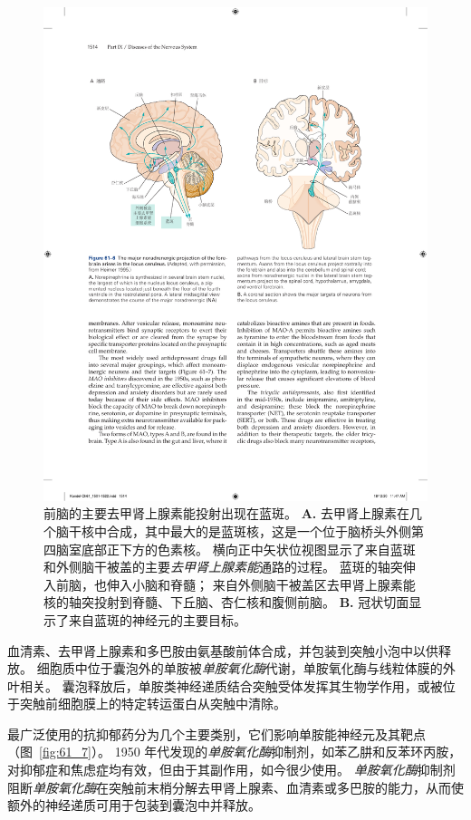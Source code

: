 \begin{figure}[htbp]
	\centering
	\includegraphics[width=1.0\linewidth]{chap61/fig_61_6}
	\caption{前脑的主要去甲肾上腺素能投射出现在蓝斑\cite{heimer2012human}。
		\textbf{A.} 去甲肾上腺素在几个脑干核中合成，其中最大的是蓝斑核，这是一个位于脑桥头外侧第四脑室底部正下方的色素核。
		横向正中矢状位视图显示了来自蓝斑和外侧脑干被盖的主要\textit{去甲肾上腺素能}通路的过程。
		蓝斑的轴突伸入前脑，也伸入小脑和脊髓；
		来自外侧脑干被盖区去甲肾上腺素能核的轴突投射到脊髓、下丘脑、杏仁核和腹侧前脑。
		\textbf{B.} 冠状切面显示了来自蓝斑的神经元的主要目标。}
	\label{fig:61_6}
\end{figure}


血清素、去甲肾上腺素和多巴胺由氨基酸前体合成，并包装到突触小泡中以供释放。
细胞质中位于囊泡外的单胺被\textit{单胺氧化酶}代谢，单胺氧化酶与线粒体膜的外叶相关。
囊泡释放后，单胺类神经递质结合突触受体发挥其生物学作用，或被位于突触前细胞膜上的特定转运蛋白从突触中清除。


最广泛使用的抗抑郁药分为几个主要类别，它们影响单胺能神经元及其靶点（图~\ref{fig:61_7}）。
1950 年代发现的\textit{单胺氧化酶}抑制剂，如苯乙肼和反苯环丙胺，对抑郁症和焦虑症均有效，但由于其副作用，如今很少使用。
\textit{单胺氧化酶}抑制剂阻断\textit{单胺氧化酶}在突触前末梢分解去甲肾上腺素、血清素或多巴胺的能力，从而使额外的神经递质可用于包装到囊泡中并释放。


